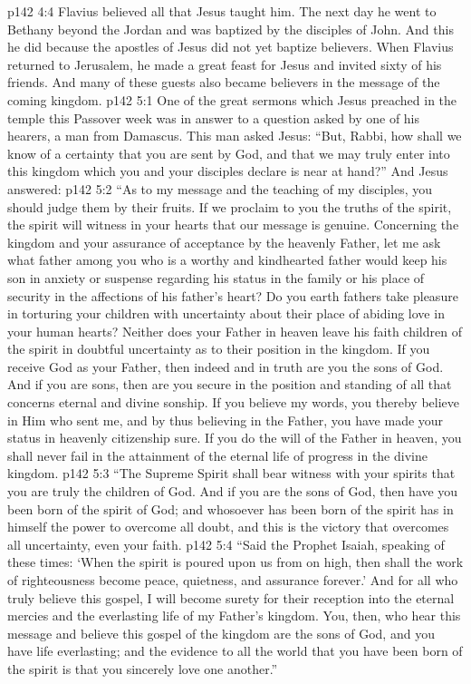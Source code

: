 \vs p142 4:4 \pc Flavius believed all that Jesus taught him. The next day he went to Bethany beyond the Jordan and was baptized by the disciples of John. And this he did because the apostles of Jesus did not yet baptize believers. When Flavius returned to Jerusalem, he made a great feast for Jesus and invited sixty of his friends. And many of these guests also became believers in the message of the coming kingdom.
\vs p142 5:1 One of the great sermons which Jesus preached in the temple this Passover week was in answer to a question asked by one of his hearers, a man from Damascus. This man asked Jesus: “But, Rabbi, how shall we know of a certainty that you are sent by God, and that we may truly enter into this kingdom which you and your disciples declare is near at hand?” And Jesus answered:
\vs p142 5:2 \pc \textcolor{ubdarkred}{“As to my message and the teaching of my disciples, you should judge them by their fruits. If we proclaim to you the truths of the spirit, the spirit will witness in your hearts that our message is genuine. Concerning the kingdom and your assurance of acceptance by the heavenly Father, let me ask what father among you who is a worthy and kindhearted father would keep his son in anxiety or suspense regarding his status in the family or his place of security in the affections of his father’s heart? Do you earth fathers take pleasure in torturing your children with uncertainty about their place of abiding love in your human hearts? Neither does your Father in heaven leave his faith children of the spirit in doubtful uncertainty as to their position in the kingdom. If you receive God as your Father, then indeed and in truth are you the sons of God. And if you are sons, then are you secure in the position and standing of all that concerns eternal and divine sonship. If you believe my words, you thereby believe in Him who sent me, and by thus believing in the Father, you have made your status in heavenly citizenship sure. If you do the will of the Father in heaven, you shall never fail in the attainment of the eternal life of progress in the divine kingdom.}
\vs p142 5:3 \textcolor{ubdarkred}{“The Supreme Spirit shall bear witness with your spirits that you are truly the children of God. And if you are the sons of God, then have you been born of the spirit of God; and whosoever has been born of the spirit has in himself the power to overcome all doubt, and this is the victory that overcomes all uncertainty, even your faith.}
\vs p142 5:4 \textcolor{ubdarkred}{“Said the Prophet Isaiah, speaking of these times: ‘When the spirit is poured upon us from on high, then shall the work of righteousness become peace, quietness, and assurance forever.’ And for all who truly believe this gospel, I will become surety for their reception into the eternal mercies and the everlasting life of my Father’s kingdom. You, then, who hear this message and believe this gospel of the kingdom are the sons of God, and you have life everlasting; and the evidence to all the world that you have been born of the spirit is that you sincerely love one another.”}
